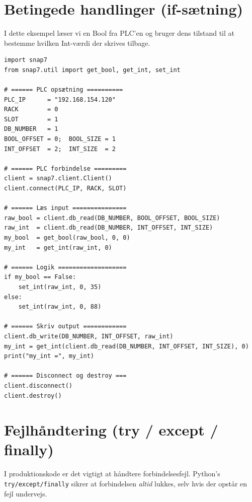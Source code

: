 \documentclass[12pt, a4paper]{article}
\begin{document}
\section{Betingede handlinger (if-sætning)}

I dette eksempel læser vi en Bool fra PLC'en og bruger dens tilstand til at
bestemme hvilken Int-værdi der skrives tilbage.

\begin{tcolorbox}[pythonbox, title={\faPython\quad Kode 4 — If-sætning baseret på PLC-data}]
\begin{verbatim}
import snap7
from snap7.util import get_bool, get_int, set_int

# ====== PLC opsætning ==========
PLC_IP      = "192.168.154.120"
RACK        = 0
SLOT        = 1
DB_NUMBER   = 1
BOOL_OFFSET = 0;  BOOL_SIZE = 1
INT_OFFSET  = 2;  INT_SIZE  = 2

# ====== PLC forbindelse =========
client = snap7.client.Client()
client.connect(PLC_IP, RACK, SLOT)

# ====== Læs input ===============
raw_bool = client.db_read(DB_NUMBER, BOOL_OFFSET, BOOL_SIZE)
raw_int  = client.db_read(DB_NUMBER, INT_OFFSET, INT_SIZE)
my_bool  = get_bool(raw_bool, 0, 0)
my_int   = get_int(raw_int, 0)

# ====== Logik ===================
if my_bool == False:
    set_int(raw_int, 0, 35)
else:
    set_int(raw_int, 0, 88)

# ====== Skriv output ============
client.db_write(DB_NUMBER, INT_OFFSET, raw_int)
my_int = get_int(client.db_read(DB_NUMBER, INT_OFFSET, INT_SIZE), 0)
print("my_int =", my_int)

# ====== Disconnect og destroy ===
client.disconnect()
client.destroy()
\end{verbatim}
\end{tcolorbox}

\clearpage
\section{Fejlhåndtering (try / except / finally)}

I produktionskode er det vigtigt at håndtere forbindelsesfejl.
Python's \texttt{try/except/finally} sikrer at forbindelsen \emph{altid} lukkes,
selv hvis der opstår en fejl undervejs.
\end{document}

